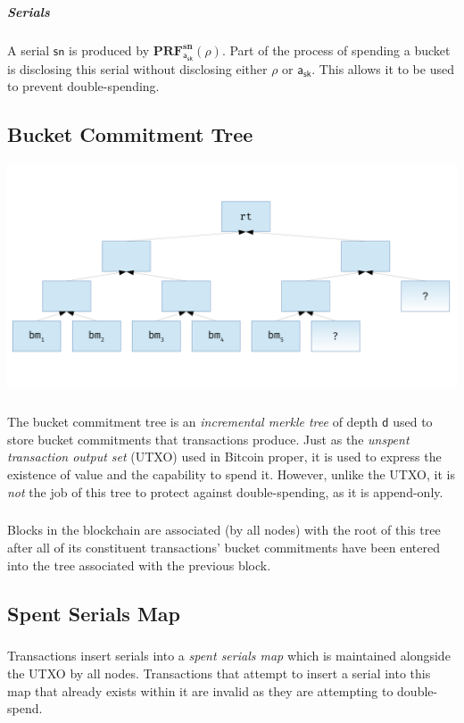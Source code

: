 \documentclass[8pt]{article}
\newcommand{\SpendAuthorityPrivate}{\mathsf{a_{sk}}}
\newcommand{\BucketAddressRand}{\mathsf{\rho}}
\newcommand{\PRF}[2]{\mathbf{PRF_{#1}^{#2}}}
\newcommand{\PRFsn}[1]{\PRF{#1}{sn}}
\newcommand{\MerkleDepth}{\mathsf{d}}
\newcommand{\sn}{\mathsf{sn}}
\begin{document}
\subparagraph{Serials}

A serial $\sn$ is produced by $\PRFsn{\SpendAuthorityPrivate}(\BucketAddressRand)$. Part of the process of spending a bucket is disclosing this serial without disclosing either $\BucketAddressRand$ or $\SpendAuthorityPrivate$. This allows it to be used to prevent double-spending.

\subsection{Bucket Commitment Tree}

\begin{center}
\includegraphics[scale=.4]{incremental_merkle}
\end{center}

\subparagraph{}

The bucket commitment tree is an \textit{incremental merkle tree} of depth $\MerkleDepth$ used to store bucket commitments that transactions produce. Just as the \textit{unspent transaction output set} (UTXO) used in Bitcoin proper, it is used to express the existence of value and the capability to spend it. However, unlike the UTXO, it is \textit{not} the job of this tree to protect against double-spending, as it is append-only.

\subparagraph{}

Blocks in the blockchain are associated (by all nodes) with the root of this tree after all of its constituent transactions' bucket commitments have been entered into the tree associated with the previous block.

\subsection{Spent Serials Map}

\subparagraph{}

Transactions insert serials into a \textit{spent serials map} which is maintained alongside the UTXO by all nodes. Transactions that attempt to insert a serial into this map that already exists within it are invalid as they are attempting to double-spend.
\end{document}
